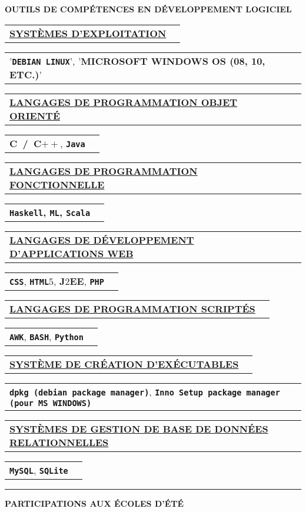 \documentclass[9pt,a4paper]{article} %
\makeatletter
\newcommand{\headerrow}[2]
{\begin{tabular*}{\linewidth}{l@{\extracolsep{\fill}}r}
	#1 &
	#2 \\
\end{tabular*}}
\newcommand{\headerrowONE}[1]{\headerrow{#1}{}}
\newcommand{\cplusplus}{C$++$\xspace}
\newcommand{\java}{\texttt{Java}\xspace}
\newcommand{\css}{\texttt{CSS}\xspace}
\newcommand{\html}{\texttt{HTML$5$}\xspace}
\newcommand{\jtwoee}{J$2$EE\xspace}
\newcommand{\php}{\texttt{PHP}\xspace}
\newcommand{\dpkgmanager}{\texttt{dpkg (debian package manager)}\xspace}
\newcommand{\innosetuppackagemanager}{\texttt{Inno Setup package manager (pour MS~WINDOWS)}\xspace}
\newcommand{\AWK}{\texttt{AWK}\xspace}
\newcommand{\bash}{\texttt{BASH}\xspace}
\newcommand{\python}{\texttt{Python}\xspace}
\newcommand{\scala}{\texttt{Scala}\xspace}
\newcommand{\haskell}{\texttt{Haskell}\xspace}
\newcommand{\ml}{\texttt{ML}\xspace}
\newcommand{\mysql}{\texttt{MySQL}\xspace}
\newcommand{\sqlite}{\texttt{SQLite}\xspace}
\newcommand{\yerothdebian}{\texttt{DEBIAN LINUX}\xspace}
\makeatother
\begin{document}
\vspace{0em}

\begin{center}
{\large \textbf{OUTILS DE COMPÉTENCES EN DÉVELOPPEMENT LOGICIEL}}
\end{center}

\vspace{0.5em}

\headerrowONE{\textbf{\underline{SYSTÈMES D'EXPLOITATION}}}
\headerrowONE{'\textbf{\yerothdebian}', '\textbf{MICROSOFT WINDOWS OS (08, 10, ETC.)}'}

\vspace{0.3em}

\headerrowONE{\textbf{\underline{LANGAGES DE PROGRAMMATION OBJET ORIENTÉ}}}
\headerrowONE{\textbf{C~/~\cplusplus}, \textbf{\java}}

\vspace{0.3em}

\headerrowONE{\textbf{\underline{LANGAGES DE PROGRAMMATION FONCTIONNELLE}}}
\headerrowONE{\textbf{\textbf{\haskell}, \textbf{\ml}, \scala}}

\vspace{0.3em}

\headerrowONE{\textbf{\underline{LANGAGES DE DÉVELOPPEMENT D'APPLICATIONS WEB}}}
\headerrowONE{\textbf{\css}, \textbf{\html}, \textbf{\jtwoee}, \textbf{\php}}

\vspace{0.3em}

\headerrowONE{\textbf{\underline{LANGAGES DE PROGRAMMATION SCRIPTÉS}}}
\headerrowONE{\textbf{\AWK}, \textbf{\bash}, \textbf{\python}}

\vspace{0.3em}

\headerrowONE{\textbf{\underline{SYSTÈME DE CRÉATION D'EXÉCUTABLES}}}
\headerrowONE{\textbf{\dpkgmanager}, \textbf{\innosetuppackagemanager}}

\vspace{0.3em}

\headerrowONE{\textbf{\underline{SYSTÈMES DE GESTION DE BASE DE DONNÉES RELATIONNELLES}}}
\headerrowONE{\textbf{\mysql}, \textbf{\sqlite}}

\vspace{1em}

\hrule
\begin{center}
{\large \textbf{PARTICIPATIONS AUX ÉCOLES D'ÉTÉ}}
\end{center}
\end{document}

